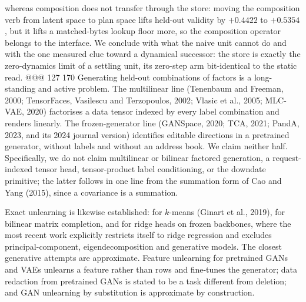 whereas composition does not transfer through the store: moving the composition verb from
latent space to plan space lifts held-out validity by $+0.4422$ to $+0.5354$, but it lifts a matched-bytes lookup floor more, so the composition operator belongs to the interface.
We conclude with what the naive unit cannot do and with the one measured clue toward a
dynamical successor: the store is exactly the zero-dynamics limit of a settling unit, its zero-step arm bit-identical to the static read. %
@@@ 127 170
Generating held-out combinations of factors is a long-standing and active problem. The multilinear line (Tenenbaum and Freeman, 2000; TensorFaces,
Vasilescu and Terzopoulos, 2002; Vlasic et al., 2005; MLC-VAE, 2020) factorises a data tensor
indexed by every label combination and renders linearly. The frozen-generator line (GANSpace,
2020; TCA, 2021; PandA, 2023, and its 2024 journal version) identifies editable directions in a
pretrained generator, without labels and without an address book. We claim neither half.
Specifically, we do not claim multilinear or bilinear factored generation, a request-indexed
tensor head, tensor-product label conditioning, or the downdate primitive; the latter follows
in one line from the summation form of Cao and Yang (2015), since a covariance is a summation.

Exact unlearning is likewise established: for $k$-means (Ginart et al., 2019), for bilinear
matrix completion, and for ridge heads on frozen backbones, where the most recent work
explicitly restricts itself to ridge regression and excludes principal-component,
eigendecomposition and generative models. The closest generative attempts are approximate.
Feature unlearning for pretrained GANs and VAEs unlearns a feature rather than rows and
fine-tunes the generator; data redaction from pretrained GANs is stated to be a task different
from deletion; and GAN unlearning by substitution is approximate by construction.

